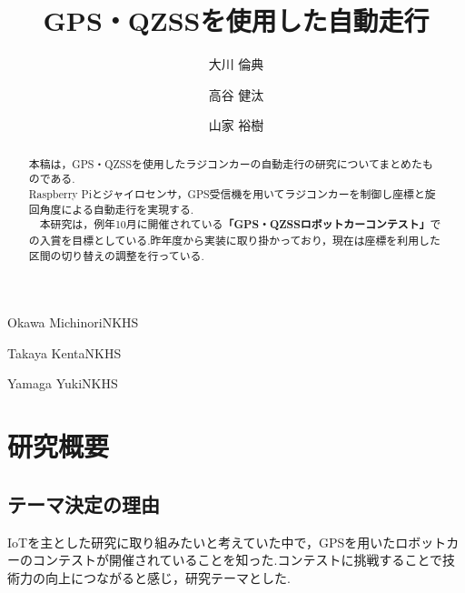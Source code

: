 \documentclass[submit,techrep,noauthor]{ipsj}
\begin{document}
\title{GPS・QZSSを使用した自動走行}



\author{大川 倫典}{Okawa Michinori}{NKHS}
\author{高谷 健汰}{Takaya Kenta}{NKHS}
\author{山家 裕樹}{Yamaga Yuki}{NKHS}

\begin{abstract}
本稿は，GPS・QZSSを使用したラジコンカーの自動走行の研究についてまとめたものである.\\
Raspberry Piとジャイロセンサ，GPS受信機を用いてラジコンカーを制御し座標と旋回角度による自動走行を実現する.\\
　本研究は，例年10月に開催されている\textbf{「GPS・QZSSロボットカーコンテスト」}での入賞を目標としている.昨年度から実装に取り掛かっており，現在は座標を利用した区間の切り替えの調整を行っている.

\end{abstract}

%
%
%

\maketitle
\section{研究概要}

\subsection{テーマ決定の理由}
IoTを主とした研究に取り組みたいと考えていた中で，GPSを用いたロボットカーのコンテストが開催されていることを知った.コンテストに挑戦することで技術力の向上につながると感じ，研究テーマとした.
\end{document}
